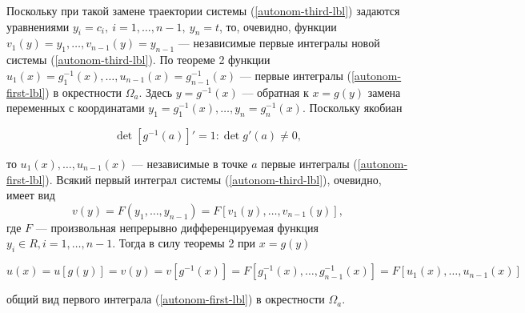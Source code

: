 \par Поскольку при такой замене траектории системы (\ref{autonom-third-lbl}) задаются уравнениями $y_i=c_i, \: i = 1, \ldots, n-1, \: y_n=t$, то, очевидно, функции $v_1(y)=y_1, \ldots, v_{n-1}(y)=y_{n-1}$ — независимые первые интегралы новой системы (\ref{autonom-third-lbl}). По теореме 2 функции $u_1(x)=g_1^{-1}(x), \ldots, u_{n-1}(x)=g_{n-1}^{-1}(x)$ — первые
интегралы (\ref{autonom-first-lbl}) в окрестности $\Omega_a$. Здесь $y=g^{-1}(x)$ — обратная к $x=g(y)$ замена переменных с координатами $y_1=g_1^{-1}(x), \ldots, y_n=g_n^{-1}(x)$. Поскольку якобиан

$$\det [g^{-1}(a)]' = 1 : \det g'(a) \neq 0,$$

\par то $u_1(x), \ldots, u_{n-1}(x)$ — независимые в точке $a$ первые интегралы (\ref{autonom-first-lbl}). Всякий первый интеграл системы (\ref{autonom-third-lbl}), очевидно, имеет вид
$$v(y) = F(y_1, \ldots, y_{n-1}) = F[v_1(y), \ldots,v_{n-1}(y)],$$
где $F$ — произвольная непрерывно дифференцируемая функция $y_i \in R, i = 1, \ldots, n-1$. Тогда в силу теоремы 2 при $x=g(y)$

$$u(x)=u[g(y)]=v(y)=v[g^{-1}(x)]=F[g_1^{-1}(x), \ldots, g_{n-1}^{-1}(x)]=F[u_1(x), \ldots, u_{n-1}(x)]$$

\par общий вид первого интеграла (\ref{autonom-first-lbl}) в окрестности $\Omega_a$. \EndProof